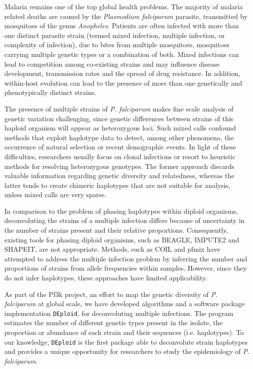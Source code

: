 \documentclass{nature}
\begin{document}
\noindent Malaria remains one of the top global health problems. The majority of malaria related deaths are caused by the {\it Plasmodium falciparum} parasite\cite{WHO2016}, transmitted by mosquitoes of the genus {\it Anopheles}. Patients are often infected with more than one distinct parasite strain (termed mixed infection, multiple infection, or complexity of infection), due to bites from multiple mosquitoes, mosquitoes carrying multiple genetic types or a combination of both. Mixed infections  can lead to competition among co-existing strains and may influence disease development\cite{deRoode2005}, transmission rates\cite{Arnot1998} and the spread of drug resistance\cite{deRoode2004}. In addition, within-host evolution can lead to the presence of more than one genetically and phenotypically distinct strains\cite{Bell2006}.

The presence of multiple strains of {\it P. falciparum} makes fine scale analysis of genetic variation challenging, since genetic differences between strains of this haploid organism will appear as heterozygous loci. Such mixed calls confound methods that exploit haplotype data to detect, among other phenomena, the occurrence of natural selection or recent demographic events\cite{Harris2013, Lawson2012, Mathieson2014, Sabeti2002}. In light of these difficulties, researchers usually focus on clonal infections or resort to heuristic methods for resolving heterozygous genotypes. The former approach discards valuable information regarding genetic diversity and relatedness, whereas the latter tends to create chimeric haplotypes that are not suitable for analysis, unless mixed calls are very sparse.

In comparison to the problem of phasing haplotypes within diploid organisms, deconvoluting the strains of a multiple infection differs because of uncertainty in the number of strains present and their relative proportions.  Consequently, existing tools for phasing diploid organisms, such as BEAGLE\cite{Browning2007}, IMPUTE2\cite{Howie2009} and SHAPEIT\cite{Delaneau2012, Oconnell2014}, are not appropriate. Methods, such as COIL\cite{Galinsky2015} and pfmix\cite{Jack2016} have attempted to address the multiple infection problem by inferring the number and proportions of strains from allele frequencies within samples.  However, since they do not infer haplotypes, these approaches have limited applicability.

As part of the Pf3k project\cite{Pf3k2016}, an effort to map the genetic diversity of {\it P. falciparum} at global scale, we have developed algorithms and a software package implementation \texttt{DEploid}, for deconvoluting multiple infections. The program estimates the number of different genetic types present in the isolate, the proportion or abundance of each strain and their sequences (i.e. haplotypes). To our knowledge, \texttt{DEploid} is the first package able to deconvolute strain haplotypes and provides a unique opportunity for researchers to study the epidemiology of {\it P. falciparum}.
\end{document}
